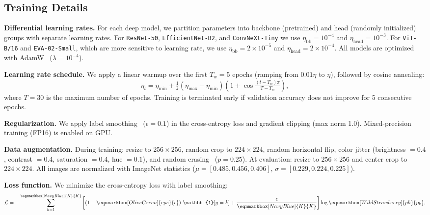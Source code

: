 \subsection{Training Details}

\textbf{Differential learning rates.} For each deep model, we partition parameters into backbone (pretrained) and head (randomly initialized) groups with separate learning rates. For \texttt{ResNet-50}, \texttt{EfficientNet-B2}, and \texttt{ConvNeXt-Tiny} we use $\eta_{\text{bb}} = 10^{-4}$ and $\eta_{\text{head}} = 10^{-3}$. For \texttt{ViT-B/16} and \texttt{EVA-02-Small}, which are more sensitive to learning rate, we use $\eta_{\text{bb}} = 2 \times 10^{-5}$ and $\eta_{\text{head}} = 2 \times 10^{-4}$. All models are optimized with AdamW~\citep{loshchilov2017decoupled} ($\lambda = 10^{-4}$).

\textbf{Learning rate schedule.} We apply a linear warmup over the first $T_w = 5$ epochs (ramping from $0.01 \eta$ to $\eta$), followed by cosine annealing:
\begin{equation}
\eta_t = \eta_{\min} + \tfrac{1}{2}(\eta_{\max} - \eta_{\min})\!\left(1 + \cos \tfrac{(t - T_w)\pi}{T - T_w}\right),
\end{equation}
where $T = 30$ is the maximum number of epochs. Training is terminated early if validation accuracy does not improve for 5 consecutive epochs.

\textbf{Regularization.} We apply label smoothing~\citep{szegedy2016rethinking} ($\epsilon = 0.1$) in the cross-entropy loss and gradient clipping (max norm 1.0). Mixed-precision training (FP16) is enabled on GPU.

\textbf{Data augmentation.} During training: resize to $256 \times 256$, random crop to $224 \times 224$, random horizontal flip, color jitter (brightness $= 0.4$, contrast $= 0.4$, saturation $= 0.4$, hue $= 0.1$), and random erasing~\citep{zhong2020random} ($p = 0.25$). At evaluation: resize to $256 \times 256$ and center crop to $224 \times 224$. All images are normalized with ImageNet statistics ($\mu = [0.485, 0.456, 0.406]$, $\sigma = [0.229, 0.224, 0.225]$).

\textbf{Loss function.} We minimize the cross-entropy loss with label smoothing:
\vspace{2em}
\begin{equation}
\label{eq:loss}
\mathcal{L} = -\sum_{k=1}^{\eqnmarkbox[NavyBlue]{K}{K}} \left[ \left(1-\eqnmarkbox[OliveGreen]{eps}{\epsilon}\right)\, \mathbb{1}[y=k] + \frac{\epsilon}{\eqnmarkbox[NavyBlue]{K}{K}} \right] \log \eqnmarkbox[WildStrawberry]{pk}{p_k},
\end{equation}
\vspace{1em}

